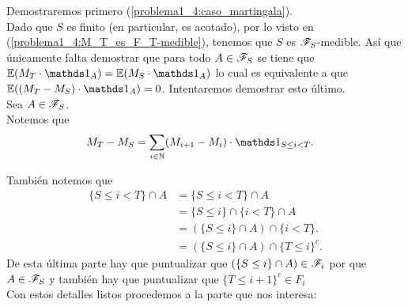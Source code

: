 	Demostraremos primero (\ref{problema1_4:caso_martingala}).\\
	
	 Dado que $S$ es finito (en particular, es acotado), por lo visto en (\ref{problema1_4:M_T_es_F_T-medible}), 
	 tenemos que $S$ es $\mathscr{F}_S$-medible. Así que únicamente falta demostrar que para todo $A \in \mathscr{F}_S$ se tiene que 
	 $\E(M_T \cdot \indic_A) = \E(M_S \cdot \indic_A)$ lo cual es equivalente a que $\E((M_T - M_S) \cdot \indic_A) = 0$.
	 Intentaremos demostrar esto último.\\
	 
	 Sea $A \in \mathscr{F}_S$.\\
	 
	 Notemos que	 
	 \begin{align}
	 	M_T - M_S &= \sum_{ i \in \N} ( M_{i+1} - M_i) \cdot \indic_{S \leq i < T }. 
	 \end{align}

	 También notemos que 
	 \begin{align}
	 	\{S \leq i < T \} \cap A 	&=		\{S \leq i < T \} \cap A 						\\
	 								&=		\{S \leq i \} \cap \{ i < T \} \cap A 			\\
	 								&=		(\{S \leq i \} \cap A) \cap \{ i < T \}.  		\\
	 								&=		(\{S \leq i \} \cap A) \cap \{ T \leq i \}^c.
	 \end{align}	 
	 \null
	 \null
	 \;De esta última parte hay que puntualizar que $(\{S \leq i \} \cap A) \in \mathscr{F}_i$ por que $A \in \mathscr{F}_S$ y también
	 hay que puntualizar que $\{ T \leq i + 1 \}^c \in F_{i}$\\
	 
	 Con estos detalles listos procedemos a la parte que nos interesa:
	 
